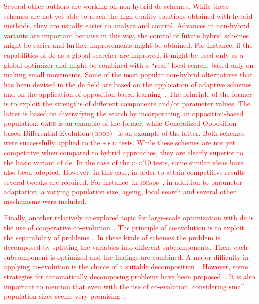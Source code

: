 \documentclass[review,3p]{elsarticle}
\newcommand{\DE}{{\sc de}}
\begin{document}
\textcolor{red}{
Several other authors are working on non-hybrid \DE{} schemes.
%
While these schemes are not yet able to reach the high-quality solutions obtained with hybrid methods, they are usually easier to analyze and control.
%
Advances in non-hybrid variants are important because in this way, the control of future hybrid schemes might be easier and further improvements might be obtained.
%
For instance, if the capabilities of \DE{} as a global searcher are improved, it might be used only as a global optimizer and might be combined 
with a ``real'' local search, based only on making small movements.
%
Some of the most popular non-hybrid alternatives that has been devised in the \DE{} field are based on the application of adaptive schemes~\cite{Yang:11} and on the application of 
opposition-based learning~\cite{Wang:11b}.
%
The principle of the former is to exploit the strengths of different components and/or parameter values.
%
The latter is based on diversifying the search by incorporating an opposition-based population.
%
\textsc{gade} is an example of the former, while Generalized Opposition-based Differential Evolution (\textsc{gode})~\cite{Wang:11b} is an example of the latter.
%
Both schemes were successfully applied to the \textsc{soco} tests.
%
While these schemes are not yet competitive when compared to hybrid approaches, they are clearly superior to the basic variant of \DE{}.
%
%
In the case of the \textsc{cec'10} tests, some similar ideas have also been adopted.
%
However, in this case, in order to attain competitive results several tweaks are required.
%
For instance, in j\textsc{de}sps~\cite{Brest:12}, in addition to parameter adaptation, a varying population size, ageing, local search and several
other mechanisms were included.
}

\textcolor{red}{
Finally, another relatively unexplored topic for large-scale optimization with \DE{} is the use of cooperative co-evolution~\cite{Potter:94}.
%
The principle of co-evolution is to exploit the separability of problems~\cite{Weise:12}.
%
In these kinds of schemes the problem is decomposed by splitting the variables into different subcomponents.
Then, each subcomponent is optimized and the findings are combined.
%
A major difficulty in applying co-evolution is the choice of a
suitable decomposition~\cite{Shi:05,Olorunda:07}.
%
However, some strategies for automatically decomposing problems have been proposed~\cite{Yang:08,Nabi:13}.
%
It is also important to mention that even with the use of co-evolution, considering
small population sizes seems very promising~\cite{Parsopoulos:09}.
}
\end{document}
